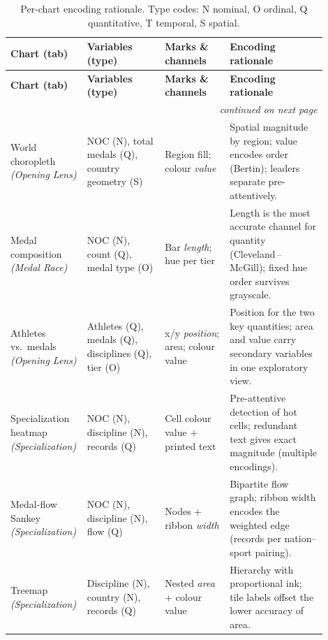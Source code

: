 \documentclass[11pt]{article}
\begin{document}
{\footnotesize\sffamily
\renewcommand{\arraystretch}{1.25}
\begin{longtable}{@{}p{0.155\linewidth} p{0.245\linewidth} p{0.20\linewidth} p{0.30\linewidth}@{}}
\caption{Per-chart encoding rationale. Type codes: N nominal, O ordinal, Q
quantitative, T temporal, S spatial.}\label{tab:rationale}\\
\toprule
\rowcolor{charcoal}\textbf{\color{white}Chart (tab)} & \textbf{\color{white}Variables (type)} & \textbf{\color{white}Marks \& channels} & \textbf{\color{white}Encoding rationale} \\
\midrule
\endfirsthead
\rowcolor{charcoal}\textbf{\color{white}Chart (tab)} & \textbf{\color{white}Variables (type)} & \textbf{\color{white}Marks \& channels} & \textbf{\color{white}Encoding rationale} \\
\midrule
\endhead
\midrule \multicolumn{4}{r}{\footnotesize\emph{continued on next page}}\\
\endfoot
\bottomrule
\endlastfoot
World choropleth \emph{(Opening Lens)} & NOC (N), total medals (Q), country geometry (S) & Region fill; colour \emph{value} & Spatial magnitude by region; value encodes order (Bertin); leaders separate pre-attentively. \\
Medal composition \emph{(Medal Race)} & NOC (N), count (Q), medal type (O) & Bar \emph{length}; hue per tier & Length is the most accurate channel for quantity (Cleveland\,--\,McGill); fixed hue order survives grayscale. \\
Athletes vs.\ medals \emph{(Opening Lens)} & Athletes (Q), medals (Q), disciplines (Q), tier (O) & x/y \emph{position}; area; colour value & Position for the two key quantities; area and value carry secondary variables in one exploratory view. \\
Specialization heatmap \emph{(Specialization)} & NOC (N), discipline (N), records (Q) & Cell colour value + printed text & Pre-attentive detection of hot cells; redundant text gives exact magnitude (multiple encodings). \\
Medal-flow Sankey \emph{(Specialization)} & NOC (N), discipline (N), flow (Q) & Nodes + ribbon \emph{width} & Bipartite flow graph; ribbon width encodes the weighted edge (records per nation--sport pairing). \\
Treemap \emph{(Specialization)} & Discipline (N), country (N), records (Q) & Nested \emph{area} + colour value & Hierarchy with proportional ink; tile labels offset the lower accuracy of area. \\

\end{longtable}}
\end{document}
